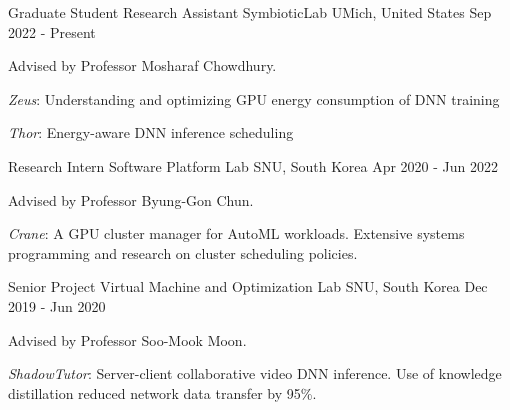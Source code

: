 

\begin{cventries}

  \cventry
    {Graduate Student Research Assistant} %
    {SymbioticLab} %
    {UMich, United States} %
    {Sep 2022 - Present} %
    {
      \begin{cvitems} %
        \item {Advised by Professor Mosharaf Chowdhury.}
        \item {\textit{Zeus}: Understanding and optimizing GPU energy consumption of DNN training}
        \item {\textit{Thor}: Energy-aware DNN inference scheduling}
      \end{cvitems}
    }
    
  \cventry
    {Research Intern} %
    {Software Platform Lab} %
    {SNU, South Korea} %
    {Apr 2020 - Jun 2022} %
    {
      \begin{cvitems} %
        \item {Advised by Professor Byung-Gon Chun.}
        \item {\textit{Crane}: A GPU cluster manager for AutoML workloads. Extensive systems programming and research on cluster scheduling policies.}
      \end{cvitems}
    }
    
  \cventry
    {Senior Project} %
    {Virtual Machine and Optimization Lab} %
    {SNU, South Korea} %
    {Dec 2019 - Jun 2020} %
    {
      \begin{cvitems} %
        \item {Advised by Professor Soo-Mook Moon.}
        \item {\textit{ShadowTutor}: Server-client collaborative video DNN inference. Use of knowledge distillation reduced network data transfer by 95\%.}
      \end{cvitems}
    }
    

\end{cventries}
